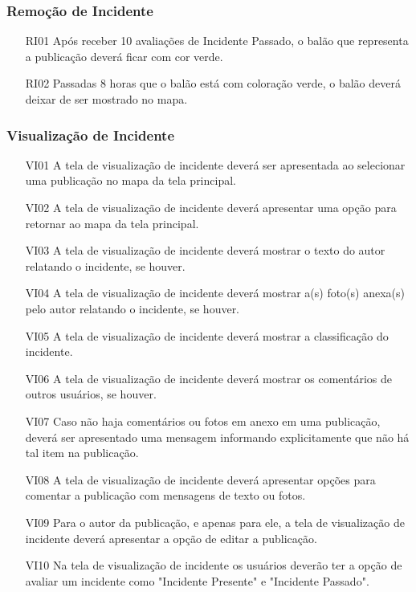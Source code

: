 \documentclass[12pt]{article}
\begin{document}
\subsubsection{Remoção de Incidente}
\begin{enumerate}
    \item [RI01] Após receber 10 avaliações de Incidente Passado, o balão que representa a publicação deverá ficar com cor verde.
    \item [RI02] Passadas 8 horas que o balão está com coloração verde, o balão deverá deixar de ser mostrado no mapa.
\end{enumerate}
\subsubsection{Visualização de Incidente}
\begin{enumerate}
    \item [VI01] A tela de visualização de incidente deverá ser apresentada ao selecionar uma publicação no mapa da tela principal.
    \item [VI02] A tela de visualização de incidente deverá apresentar uma opção para retornar ao mapa da tela principal.
    \item [VI03] A tela de visualização de incidente deverá mostrar o texto do autor relatando o incidente, se houver.
    \item [VI04] A tela de visualização de incidente deverá mostrar a(s) foto(s) anexa(s) pelo autor relatando o incidente, se houver.
    \item [VI05] A tela de visualização de incidente deverá mostrar a classificação do incidente.
    \item [VI06] A tela de visualização de incidente deverá mostrar os comentários de outros usuários, se houver.
    \item [VI07] Caso não haja comentários ou fotos em anexo em uma publicação, deverá ser apresentado uma mensagem informando explicitamente que não há tal item na publicação.
    \item [VI08] A tela de visualização de incidente deverá apresentar opções para comentar a publicação com mensagens de texto ou fotos.
    \item [VI09] Para o autor da publicação, e apenas para ele, a tela de visualização de incidente deverá apresentar a opção de editar a publicação.
    \item [VI10] Na tela de visualização de incidente os usuários deverão ter a opção de avaliar um incidente como "Incidente Presente" e "Incidente Passado".
\end{enumerate}
\end{document}

